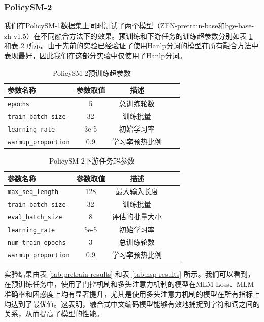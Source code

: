 \documentclass[12pt, a4paper]{ctexart}
\begin{document}
\subsubsection{PolicySM-2}
我们在PolicySM-1数据集上同时测试了两个模型（ZEN-pretrain-base和bge-base-zh-v1.5）在不同融合方法下的效果。预训练和下游任务的训练超参数分别如表 \ref{tab:pretrain_hyperparameters_2} 和表 \ref{tab:seqlevel_hyperparameters_2} 所示。由于先前的实验已经验证了使用Hanlp分词的模型在所有融合方法中表现最好，因此我们在这部分实验中仅使用了Hanlp分词。

\begin{table}[H]
    \centering
    \begin{tabular}{lcccc}
        \toprule
        \textbf{参数名称} & \textbf{参数取值} & \textbf{描述} \\
        \midrule
        \texttt{epochs} & 5 & 总训练轮数 \\ 
        \texttt{train\_batch\_size} & 32 & 训练批量 \\
        \texttt{learning\_rate} & 3e-5 & 初始学习率 \\ 
        \texttt{warmup\_proportion} & 0.9 & 学习率预热比例 \\ 
        \bottomrule
    \end{tabular}
    \caption{PolicySM-2预训练超参数}
    \label{tab:pretrain_hyperparameters_2}
\end{table}

\begin{table}[H]
    \centering
    \begin{tabular}{lcccc}
        \toprule
        \textbf{参数名称} & \textbf{参数取值} & \textbf{描述} \\ 
        \midrule
        \texttt{max\_seq\_length} & 128 & 最大输入长度\\ 
        \texttt{train\_batch\_size} & 32 & 训练批量 \\ 
        \texttt{eval\_batch\_size} & 8 & 评估的批量大小 \\
        \texttt{learning\_rate} & 5e-5 & 初始学习率 \\
        \texttt{num\_train\_epochs} & 3 & 总训练轮数 \\ 
        \texttt{warmup\_proportion} & 0.9 & 学习率预热比例 \\
        \bottomrule
    \end{tabular}
    \caption{PolicySM-2下游任务超参数}
    \label{tab:seqlevel_hyperparameters_2}
\end{table}

实验结果由表 \ref{tab:pretrain-results} 和表 \ref{tab:nsp-results} 所示。我们可以看到，在预训练任务中，使用了门控机制和多头注意力机制的模型在MLM Loss、MLM 准确率和困惑度上均有显著提升，尤其是使用多头注意力机制的模型在所有指标上均达到了最优值。这表明，融合式中文编码模型能够有效地捕捉到字符和词之间的关系，从而提高了模型的性能。
\end{document}
